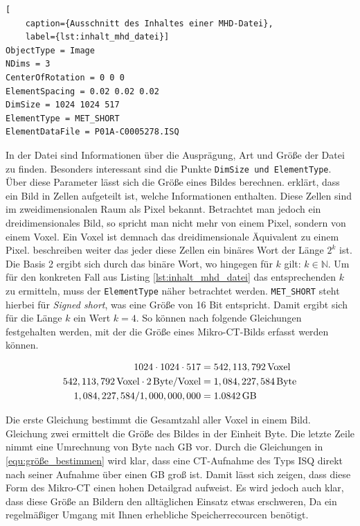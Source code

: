 \begin{lstlisting}[
	caption={Ausschnitt des Inhaltes einer MHD-Datei},
	label={lst:inhalt_mhd_datei}]
ObjectType = Image
NDims = 3
CenterOfRotation = 0 0 0
ElementSpacing = 0.02 0.02 0.02
DimSize = 1024 1024 517
ElementType = MET_SHORT
ElementDataFile = P01A-C0005278.ISQ
\end{lstlisting}

In der Datei sind Informationen über die Ausprägung, Art und Größe der Datei zu
finden. Besonders interessant sind die Punkte \texttt{DimSize und ElementType}. Über
diese Parameter lässt sich die Größe eines Bildes berechnen. \citet[S.~10-11]{burger2009}
erklärt, dass ein Bild in Zellen aufgeteilt ist, welche Informationen enthalten.
Diese Zellen sind im zweidimensionalen Raum als Pixel bekannt. Betrachtet man jedoch
ein dreidimensionales Bild, so spricht man nicht mehr von einem Pixel, sondern von
einem Voxel. Ein Voxel ist demnach das dreidimensionale Äquivalent zu einem
Pixel. \citet[S.~10-11]{burger2009} beschreiben weiter das jeder diese Zellen
ein binäres Wort der Länge $2^{k}$ ist. Die Basis 2 ergibt sich durch das binäre
Wort, wo hingegen für $k$ gilt: $k \in \mathbb{N}$. Um für den konkreten Fall
aus Listing \ref{lst:inhalt_mhd_datei} das entsprechenden $k$ zu ermitteln, muss
der \texttt{ElementType} näher betrachtet werden. \texttt{MET\_SHORT} steht
hierbei für \textit{Signed short}, was eine Größe von 16 Bit entspricht. Damit ergibt
sich für die Länge $k$ ein Wert $k = 4$. So können nach \citet[S.~10-11]{burger2009}
folgende Gleichungen festgehalten werden, mit der die Größe eines Mikro-\ac{CT}-Bilds
erfasst werden können.

\begin{align}
	\label{equ:größe_bestimmen}1024 \cdot 1024 \cdot 517    & = 542,113,792 \, \text{Voxel}\notag  \\
	542,113,792 \, \text{Voxel}\cdot 2 \, \text{Byte/Voxel} & = 1,084,227,584 \, \text{Byte}\notag \\
	1,084,227,584 / 1,000,000,000                           & = 1.0842 \, \text{GB}
\end{align}

Die erste Gleichung bestimmt die Gesamtzahl aller Voxel in einem Bild. Gleichung
zwei ermittelt die Größe des Bildes in der Einheit Byte. Die letzte Zeile nimmt
eine Umrechnung von Byte nach \ac{GB} vor. Durch die Gleichungen in
\ref{equ:größe_bestimmen} wird klar, dass eine \ac{CT}-Aufnahme des Typs \ac{ISQ}
direkt nach seiner Aufnahme über einen \ac{GB} groß ist. Damit lässt sich zeigen,
dass diese Form des Mikro-\ac{CT} einen hohen Detailgrad aufweist. Es wird
jedoch auch klar, dass diese Größe an Bildern den alltäglichen Einsatz etwas erschweren,
Da ein regelmäßiger Umgang mit Ihnen erhebliche Speicherrecourcen benötigt.

